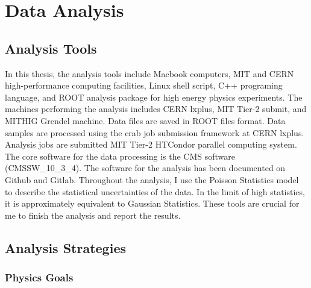 \chapter{Data Analysis}

\section{Analysis Tools}

In this thesis, the analysis tools include Macbook computers, MIT and CERN high-performance computing facilities, Linux shell script, C++ programing language, and ROOT analysis package for high energy physics experiments. The machines performing the analysis includes CERN lxplus, MIT Tier-2 submit, and MITHIG Grendel machine. Data files are saved in ROOT files format. Data samples are processed using the crab job submission framework at CERN lxplus. Analysis jobs are submitted MIT Tier-2 HTCondor parallel computing system. The core software for the data processing is the CMS software (CMSSW\_10\_3\_4). The software for the analysis has been documented on Github and Gitlab. Throughout the analysis, I use the Poisson Statistics model to describe the statistical uncertainties of the data. In the limit of high statistics, it is approximately equivalent to Gaussian Statistics. These tools are crucial for me to finish the analysis and report the results.

\section{Analysis Strategies}

\subsection{Physics Goals}

